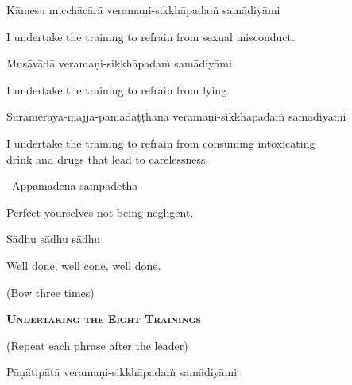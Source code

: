 Kāmesu micchācārā veramaṇi-sikkhāpadaṁ samādiyāmi

\begin{english}
  I undertake the training to refrain from sexual misconduct.
\end{english}

Musāvādā veramaṇi-sikkhāpadaṁ samādiyāmi

\begin{english}
  I undertake the training to refrain from lying.
\end{english}

\begin{pali-hang}
  Surāmeraya-majja-pamādaṭṭhānā veramaṇi-sikkhāpadaṁ samādiyāmi
\end{pali-hang}

\begin{english-hang}
  I undertake the training to refrain from consuming intoxicating\\
  drink and drugs that lead to carelessness.\hyperlink{endnote140-appendix}{\hypertarget{endnote140-body}{}}
\end{english-hang}

\anglebracketleft\ \hspace{-0.5mm}Appamādena sampādetha \hspace{-0.5mm}\anglebracketright\

\begin{english}
  Perfect yourselves not being negligent.
\end{english}

Sādhu sādhu sādhu

\begin{english}
  Well done, well cone, well done.
\end{english}

\begin{center}
(Bow three times)
\end{center}

\clearpage

\begin{center}
  \textbf{\textsc{Undertaking the Eight Trainings}}
\end{center}

\begin{center}
  (Repeat each phrase after the leader)
\end{center}

Pāṇātipātā veramaṇi-sikkhāpadaṁ samādiyāmi

